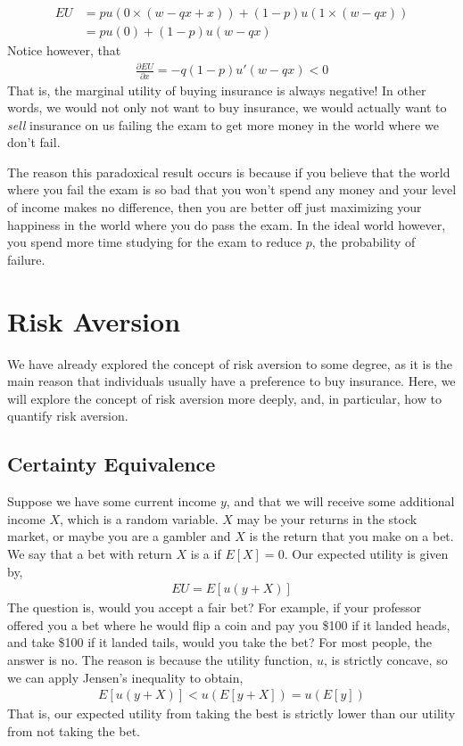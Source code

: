 \begin{align*}
    EU &= p u(0 \times (w - qx + x)) + (1 - p) u(1 \times (w - qx)) \\
    &= p u(0) + (1 - p) u(w - qx)
\end{align*}
Notice however, that
\begin{align*}
    \frac{\partial EU}{\partial x} = - q(1 - p) u'(w - qx) < 0
\end{align*}
That is, the marginal utility of buying insurance is always negative! In other words, we would not only not want to buy insurance, we would actually want to \emph{sell} insurance on us failing the exam to get more money in the world where we don't fail. 

The reason this paradoxical result occurs is because if you believe that the world where you fail the exam is so bad that you won't spend any money and your level of income makes no difference, then you are better off just maximizing your happiness in the world where you do pass the exam. In the ideal world however, you spend more time studying for the exam to reduce $p$, the probability of failure. 

\section{Risk Aversion} \label{sec:risk_aversion}
We have already explored the concept of risk aversion to some degree, as it is the main reason that individuals usually have a preference to buy insurance. Here, we will explore the concept of risk aversion more deeply, and, in particular, how to quantify risk aversion. 

\subsection*{Certainty Equivalence}
Suppose we have some current income $y$, and that we will receive some additional income $X$, which is a random variable. $X$ may be your returns in the stock market, or maybe you are a gambler and $X$ is the return that you make on a bet. We say that a bet with return $X$ is a  if $E[X] = 0$. Our expected utility is given by,
\begin{align*}
    EU = E[u(y + X)]
\end{align*}
The question is, would you accept a fair bet? For example, if your professor offered you a bet where he would flip a coin and pay you \$100 if it landed heads, and take \$100 if it landed tails, would you take the bet? For most people, the answer is no. The reason is because the utility function, $u$, is strictly concave, so we can apply Jensen's inequality to obtain,
\begin{align*}
    E[u(y + X)] < u(E[y + X]) = u(E[y])
\end{align*}
That is, our expected utility from taking the best is strictly lower than our utility from not taking the bet. 

